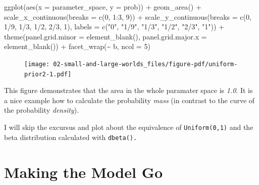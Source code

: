 \documentclass[
  letterpaper,
  DIV=11,
  numbers=noendperiod]{scrreprt}
\newenvironment{Shaded}{\begin{snugshade}}{\end{snugshade}}
\newcommand{\AttributeTok}[1]{\textcolor[rgb]{0.40,0.45,0.13}{#1}}
\newcommand{\DecValTok}[1]{\textcolor[rgb]{0.68,0.00,0.00}{#1}}
\newcommand{\FunctionTok}[1]{\textcolor[rgb]{0.28,0.35,0.67}{#1}}
\newcommand{\InformationTok}[1]{\textcolor[rgb]{0.37,0.37,0.37}{#1}}
\newcommand{\NormalTok}[1]{\textcolor[rgb]{0.00,0.23,0.31}{#1}}
\newcommand{\SpecialCharTok}[1]{\textcolor[rgb]{0.37,0.37,0.37}{#1}}
\newcommand{\StringTok}[1]{\textcolor[rgb]{0.13,0.47,0.30}{#1}}
\begin{document}
\begin{Shaded}
\begin{Highlighting}[]
  \FunctionTok{ggplot}\NormalTok{(}\FunctionTok{aes}\NormalTok{(}\AttributeTok{x =}\NormalTok{ parameter\_space, }\AttributeTok{y =}\NormalTok{ prob)) }\SpecialCharTok{+}
  \FunctionTok{geom\_area}\NormalTok{() }\SpecialCharTok{+}
  \FunctionTok{scale\_x\_continuous}\NormalTok{(}\AttributeTok{breaks =} \FunctionTok{c}\NormalTok{(}\DecValTok{0}\NormalTok{, }\DecValTok{1}\SpecialCharTok{:}\DecValTok{3}\NormalTok{, }\DecValTok{9}\NormalTok{)) }\SpecialCharTok{+}
  \FunctionTok{scale\_y\_continuous}\NormalTok{(}\AttributeTok{breaks =} \FunctionTok{c}\NormalTok{(}\DecValTok{0}\NormalTok{, }\DecValTok{1}\SpecialCharTok{/}\DecValTok{9}\NormalTok{, }\DecValTok{1}\SpecialCharTok{/}\DecValTok{3}\NormalTok{, }\DecValTok{1}\SpecialCharTok{/}\DecValTok{2}\NormalTok{, }\DecValTok{2}\SpecialCharTok{/}\DecValTok{3}\NormalTok{, }\DecValTok{1}\NormalTok{),}
                     \AttributeTok{labels =} \FunctionTok{c}\NormalTok{(}\StringTok{"0"}\NormalTok{, }\StringTok{"1/9"}\NormalTok{, }\StringTok{"1/3"}\NormalTok{, }\StringTok{"1/2"}\NormalTok{, }\StringTok{"2/3"}\NormalTok{, }\StringTok{"1"}\NormalTok{)) }\SpecialCharTok{+}
  \FunctionTok{theme}\NormalTok{(}\AttributeTok{panel.grid.minor =} \FunctionTok{element\_blank}\NormalTok{(),}
        \AttributeTok{panel.grid.major.x =} \FunctionTok{element\_blank}\NormalTok{()) }\SpecialCharTok{+}
  \FunctionTok{facet\_wrap}\NormalTok{(}\SpecialCharTok{\textasciitilde{}}\NormalTok{ b, }\AttributeTok{ncol =} \DecValTok{5}\NormalTok{)}
\InformationTok{\textasciigrave{}\textasciigrave{}\textasciigrave{}}
\end{Highlighting}
\end{Shaded}

\begin{figure}[H]

{\centering \texttt{[image: 02-small-and-large-worlds\_files/figure-pdf/uniform-prior2-1.pdf]}

}

\end{figure}

This figure demonstrates that the area in the whole paramater space is
\emph{1.0}. It is a nice example how to calculate the probability
\emph{mass} (in contrast to the curve of the probability
\emph{density}).

I will skip the excursus and plot about the equivalence of
\texttt{Uniform(0,1)} and the beta distribution calculated with
\texttt{dbeta().}

\hypertarget{making-the-model-go}{%
\section{Making the Model Go}\label{making-the-model-go}}
\end{document}
